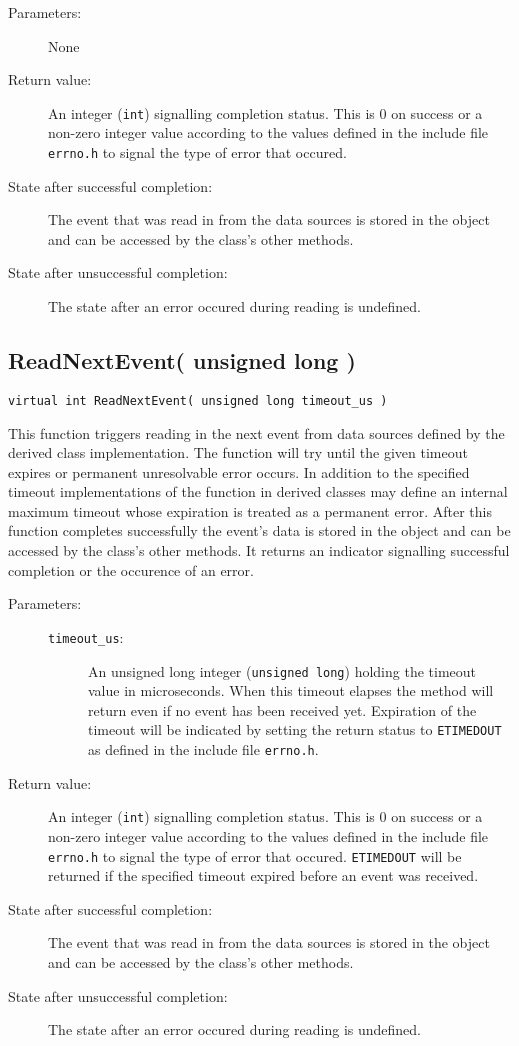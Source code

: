 \documentclass[a4paper,twoside]{article}
\begin{document}
\begin{description}
\item[Parameters:] None
\item[Return value:] An integer (\texttt{int}) signalling completion status. This is 0 on success or a non-zero integer value according to the values defined in the 
include file \texttt{errno.h} to signal the type of error that occured. 
\item[State after successful completion:] The event that was read in from the data sources is stored in the object and can be accessed by the class's other methods.
\item[State after unsuccessful completion:] The state after an error occured during reading is undefined.
\end{description}


\subsection{ReadNextEvent( unsigned long )}
\label{Subsec:MonitoringReader::ReadNextEvent:unsignedlong}
\texttt{virtual int ReadNextEvent( unsigned long timeout\_us )}

This function triggers reading in the next event from data sources defined by the derived class implementation. 
The function will try until the given timeout expires or  permanent unresolvable error occurs. 
In addition to the specified timeout implementations of the function in derived classes may 
define an internal maximum timeout whose expiration is treated as a permanent error. After
this function completes successfully the event's data is stored in the object and can be accessed by the class's other methods. It returns an 
indicator signalling successful completion or the occurence of an error. 

\begin{description}
\item[Parameters:]
	\begin{description}
	\item[\texttt{timeout\_us}:] An unsigned long integer (\texttt{unsigned long}) holding the timeout value in microseconds. When this timeout elapses the method will return 
	even if no event has been received yet. Expiration of the timeout will be indicated by setting the return status to \texttt{ETIMEDOUT} as defined in the 
	include file \texttt{errno.h}. 
	\end{description}
\item[Return value:] An integer (\texttt{int}) signalling completion status. This is 0 on success or a non-zero integer value according to the values defined in the 
include file \texttt{errno.h} to signal the type of error that occured. \texttt{ETIMEDOUT} will be returned if the specified timeout expired before an event was received.
\item[State after successful completion:] The event that was read in from the data sources is stored in the object and can be accessed by the class's other methods.
\item[State after unsuccessful completion:] The state after an error occured during reading is undefined.
\end{description}
\end{document}
